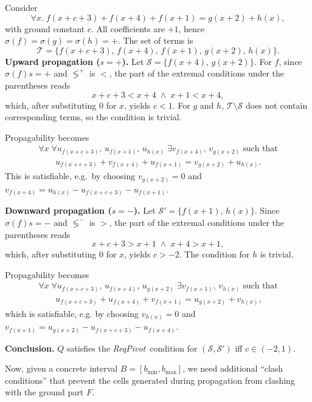 \documentclass[runningheads]{llncs}
\newcommand{\cmpsignstrict}[1]{\lessgtr^{#1}}
\newcommand{\coeffsign}[1]{\sigma(#1)}
\newcommand{\req}{\emph{ReqPivot}\xspace}
\begin{document}
\begin{example}[\req\ Illustration]
\label{ex:req-illustration}
Consider
\[
\forall x.\;f(x+c+3)+f(x+4)+f(x+1)=g(x+2)+h(x),
\]
with ground constant $c$. All coefficients are $+1$, hence
$\coeffsign{f}=\coeffsign{g}=\coeffsign{h}=+$.
The set of terms is
\[
\mathcal{T} =\{f(x+c+3),\,f(x+4),\,f(x+1),\,g(x+2),\,h(x)\}.
\]
\smallskip
\noindent\textbf{Upward propagation ($s=+$).}
Let $\mathcal{S}=\{f(x+4),\,g(x+2)\}$.
For $f$, since $\coeffsign{f}s=+$ and $\cmpsignstrict{+}$ is $<$, the part of the extremal conditions under the parentheses reads
\[
x+c+3<x+4\;\land\;x+1<x+4,
\]
which, after substituting $0$ for $x$, yields $c<1$. For $g$ and $h$, $\mathcal{T}\setminus\mathcal{S}$ does not contain corresponding terms, so the condition is trivial.

Propagability becomes
\[
\begin{aligned}
    \forall x\;\forall u_{f(x+c+3)},\,u_{f(x+1)},\,u_{h(x)}\;\exists v_{f(x+4)},\,v_{g(x+2)}\;\text{such that} \\
    \qquad
    u_{f(x+c+3)}+v_{f(x+4)}+u_{f(x+1)} = v_{g(x+2)}+u_{h(x)}.
\end{aligned}
\]
This is satisfiable, e.g.\ by choosing $v_{g(x+2)}=0$ and $v_{f(x+4)}=u_{h(x)}-u_{f(x+c+3)}-u_{f(x+1)}$.

\smallskip
\noindent\textbf{Downward propagation ($s=-$).}
Let $\mathcal{S}'=\{f(x+1),\,h(x)\}$. Since $\coeffsign{f}s=-$ and $\cmpsignstrict{-}$ is $>$,  the part of the extremal conditions under the parentheses reads
\[
x+c+3>x+1\;\land\;x+4>x+1,
\]
which, after substituting $0$ for $x$, yields $c>-2$. The condition for $h$ is trivial.

Propagability becomes
\[
\begin{aligned}
    \forall x\;\forall u_{f(x+c+3)},\,u_{f(x+4)},\,u_{g(x+2)}\;\exists v_{f(x+1)},\,v_{h(x)}\;\text{such that} \\
    \qquad
    u_{f(x+c+3)}+u_{f(x+4)}+v_{f(x+1)}=u_{g(x+2)}+v_{h(x)},
\end{aligned}
\]
which is satisfiable, e.g. by choosing $v_{h(x)}=0$ and $v_{f(x+1)}=u_{g(x+2)}-u_{f(x+c+3)}-u_{f(x+4)}$.

\smallskip
\noindent\textbf{Conclusion.}
$Q$ satisfies the \req\ condition for $(\mathcal{S},\mathcal{S}')$
iff $c\in(-2,1)$.
\end{example}

Now, given a concrete interval $B = [b_{\min}, b_{\max}]$, we need additional ``clash conditions'' that prevent the cells generated during propagation from clashing with the ground part $F$.
\end{document}
